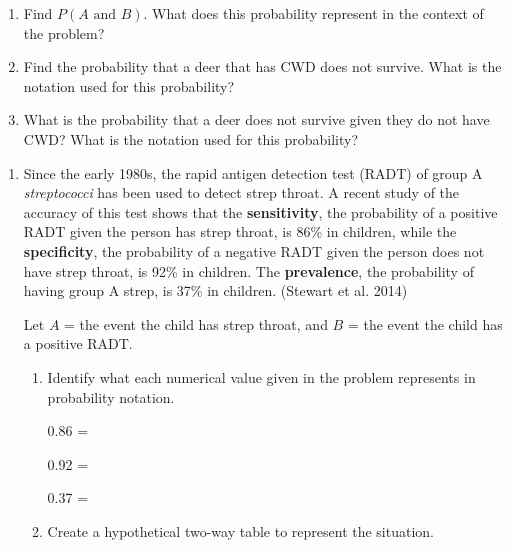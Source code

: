 \documentclass[
]{report}
\begin{document}
\begin{enumerate}
\def\labelenumi{\alph{enumi}.}
\setcounter{enumi}{2}
\item
  Find \(P(A \mbox{ and } B)\). What does this probability represent in the context of the problem?
  \vspace{.8in}
\item
  Find the probability that a deer that has CWD does not survive. What is the notation used for this probability?
  \vspace{.8in}
\item
  What is the probability that a deer does not survive given they do not have CWD? What is the notation used for this probability?
\end{enumerate}

\newpage

\begin{enumerate}
\def\labelenumi{\arabic{enumi}.}
\setcounter{enumi}{2}
\item
  Since the early 1980s, the rapid antigen detection test (RADT) of group A \emph{streptococci} has been used to detect strep throat. A recent study of the accuracy of this test shows that the \textbf{sensitivity}, the probability of a positive RADT given the person has strep throat, is 86\% in children, while the \textbf{specificity}, the probability of a negative RADT given the person does not have strep throat, is 92\% in children. The \textbf{prevalence}, the probability of having group A strep, is 37\% in children. (Stewart et al. 2014)
  \vspace{1mm}

  Let \(A\) = the event the child has strep throat, and \(B\) = the event the child has a positive RADT.
  \vspace{0.1in}

  \begin{enumerate}
  \def\labelenumii{\alph{enumii}.}
  \item
    Identify what each numerical value given in the problem represents in probability notation.
    \vspace{.1in}

    0.86 =\\
    \vspace{.1in}

    0.92 =\\
    \vspace{.1in}

    0.37 =\\
    \vspace{.1in}
  \item
    Create a hypothetical two-way table to represent the situation.
  \end{enumerate}
\end{enumerate}
\end{document}
